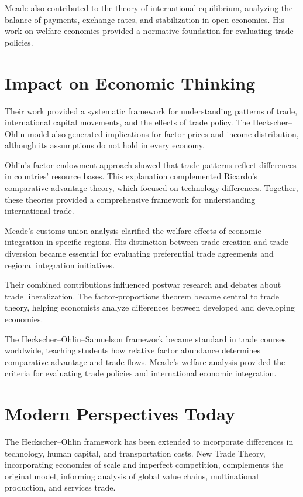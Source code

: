 Meade also contributed to the theory of international equilibrium, analyzing
the balance of payments, exchange rates, and stabilization in open economies.
His work on welfare economics provided a normative foundation for evaluating
trade policies.

\section{Impact on Economic Thinking}
Their work provided a systematic framework for understanding patterns of trade,
international capital movements, and the effects of trade policy. The
Heckscher--Ohlin model also generated implications for factor prices and income
distribution, although its assumptions do not hold in every economy.

Ohlin's factor endowment approach showed that trade patterns reflect
differences in countries' resource bases. This explanation complemented
Ricardo's comparative advantage theory, which focused on technology
differences. Together, these theories provided a comprehensive framework
for understanding international trade.

Meade's customs union analysis clarified the welfare effects of economic
integration in specific regions. His distinction between trade creation and
trade diversion became essential for evaluating preferential trade agreements
and regional integration initiatives.

Their combined contributions influenced postwar research and debates about
trade liberalization. The factor-proportions theorem became central to trade
theory, helping economists analyze differences between developed and developing
economies.

The Heckscher--Ohlin--Samuelson framework became standard in trade courses
worldwide, teaching students how relative factor abundance determines
comparative advantage and trade flows. Meade's welfare analysis provided the
criteria for evaluating trade policies and international economic integration.

\section{Modern Perspectives Today}
The Heckscher--Ohlin framework has been extended to incorporate differences in
technology, human capital, and transportation costs. New Trade Theory,
incorporating economies of scale and imperfect competition, complements the
original model, informing analysis of global value chains, multinational
production, and services trade.

